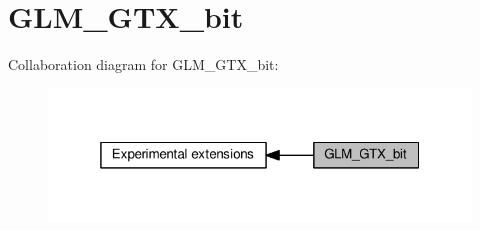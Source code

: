 \hypertarget{group__gtx__bit}{}\section{G\+L\+M\+\_\+\+G\+T\+X\+\_\+bit}
\label{group__gtx__bit}
Collaboration diagram for G\+L\+M\+\_\+\+G\+T\+X\+\_\+bit\+:
\nopagebreak
\begin{figure}[H]
\begin{center}
\leavevmode
\includegraphics[width=319pt]{d5/ddd/group__gtx__bit}
\end{center}
\end{figure}
